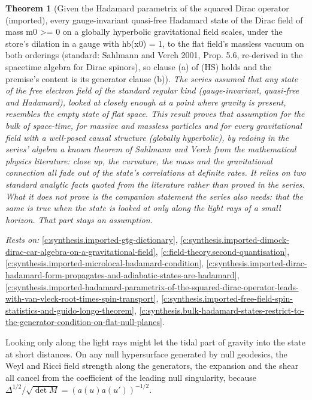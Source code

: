 \documentclass[11pt]{article}
\newtheorem{theorem}{Theorem}[section]
\theoremstyle{definition}
\theoremstyle{plain}
\begin{document}
\begin{theorem}[Given the Hadamard parametrix of the squared Dirac operator (imported), every gauge-invariant quasi-free Hadamard state of the Dirac field of mass m0 >= 0 on a globally hyperbolic gravitational field scales, under the store's dilation in a gauge with hb(x0) = 1, to the flat field's massless vacuum on both orderings (standard: Sahlmann and Verch 2001, Prop. 5.6, re-derived in the spacetime algebra for Dirac spinors), so clause (a) of (HS) holds and the premise's content is its generator clause (b)]\label{c:synthesis.hadamard-dirac-states-scale-to-the-flat-massless-vacuum-at-every-point-of-a-gravitational-field}
The series assumed that any state of the free electron field of the standard regular kind (gauge-invariant, quasi-free and Hadamard), looked at closely enough at a point where gravity is present, resembles the empty state of flat space. This result proves that assumption for the bulk of space-time, for massive and massless particles and for every gravitational field with a well-posed causal structure (globally hyperbolic), by redoing in the series' algebra a known theorem of Sahlmann and Verch from the mathematical physics literature: close up, the curvature, the mass and the gravitational connection all fade out of the state's correlations at definite rates. It relies on two standard analytic facts quoted from the literature rather than proved in the series. What it does not prove is the companion statement the series also needs: that the same is true when the state is looked at only along the light rays of a small horizon. That part stays an assumption.
\end{theorem}
\noindent\emph{Rests on:} \ref{c:synthesis.imported-gtg-dictionary}, \ref{c:synthesis.imported-dimock-dirac-car-algebra-on-a-gravitational-field}, \ref{c:field-theory.second-quantisation}, \ref{c:synthesis.imported-microlocal-hadamard-condition}, \ref{c:synthesis.imported-dirac-hadamard-form-propagates-and-adiabatic-states-are-hadamard}, \ref{c:synthesis.imported-hadamard-parametrix-of-the-squared-dirac-operator-leads-with-van-vleck-root-times-spin-transport}, \ref{c:synthesis.imported-free-field-spin-statistics-and-guido-longo-theorem}, \ref{c:synthesis.bulk-hadamard-states-restrict-to-the-generator-condition-on-flat-null-planes}.

Looking only along the light rays might let the tidal part of gravity into the state at short distances. On any null hypersurface generated by null geodesics, the Weyl and Ricci field strength along the generators, the expansion and the shear all cancel from the coefficient of the leading null singularity, because $\Delta^{1/2}/\sqrt{\det M} = (a(u)a(u'))^{-1/2}$.
\end{document}
